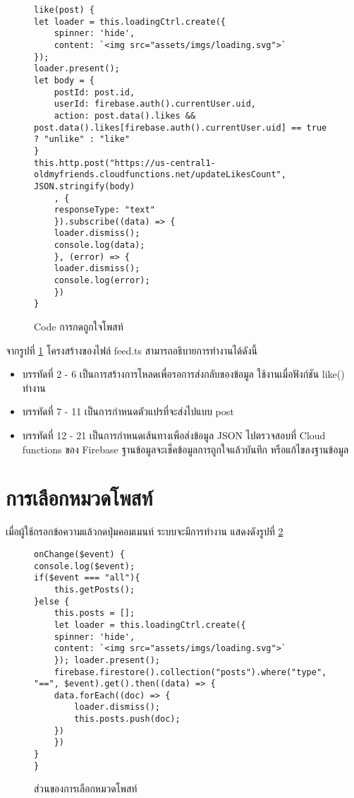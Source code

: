 \begin{figure}[H]
{\lstset{language=Pascal}
\begin{lstlisting}
like(post) {
let loader = this.loadingCtrl.create({
	spinner: 'hide',
	content: `<img src="assets/imgs/loading.svg">`
});
loader.present();
let body = {
	postId: post.id,
	userId: firebase.auth().currentUser.uid,
	action: post.data().likes && post.data().likes[firebase.auth().currentUser.uid] == true ? "unlike" : "like"
}
this.http.post("https://us-central1-oldmyfriends.cloudfunctions.net/updateLikesCount", JSON.stringify(body)
	, {
	responseType: "text"
	}).subscribe((data) => {
	loader.dismiss();
	console.log(data);
	}, (error) => {
	loader.dismiss();
	console.log(error);
	})
}
\end{lstlisting}}
\caption{Code การกดถูกใจโพสท์}
\label{Fig:4-likepost}
\end{figure}

จากรูปที่ \ref{Fig:4-likepost} โครงสร้างของไฟล์ feed.ts สามารถอธิบายการทำงานได้ดังนี้
\begin{itemize}[label={--}]
\item บรรทัดที่ 2 - 6 เป็นการสร้างการโหลดเพื่อรอการส่งกลับของข้อมูล ใช้งานเมื่อฟังก์ชัน like() ทำงาน
\item บรรทัดที่ 7 - 11 เป็นการกำหนดตัวแปรที่จะส่งไปแบบ post
\item บรรทัดที่ 12 - 21 เป็นการกำหนดเส้นทางเพือส่งข้อมูล JSON ไปตรวจสอบที่ Cloud functions ของ Firebase ฐานข้อมูลจะเช็คข้อมูลการถูกใจแล้วบันทึก หรือแก้ไขลงฐานข้อมูล
\end{itemize}
\newpage



\section{การเลือกหมวดโพสท์}
เมื่อผู้ใช้กรอกข้อความแล้วกดปุ่มคอมเมนท์ ระบบจะมีการทำงาน แสดงดังรูปที่ \ref{Fig:4-selectpost}

\begin{figure}[H]
{\lstset{language=Pascal}
\begin{lstlisting}
onChange($event) {
console.log($event);
if($event === "all"){
	this.getPosts();
}else {
	this.posts = [];
	let loader = this.loadingCtrl.create({
	spinner: 'hide',
	content: `<img src="assets/imgs/loading.svg">`
	}); loader.present();
	firebase.firestore().collection("posts").where("type", "==", $event).get().then((data) => {
	data.forEach((doc) => {
		loader.dismiss();
		this.posts.push(doc);
	})
	})
}
}
\end{lstlisting}}
\caption{ส่วนของการเลือกหมวดโพสท์}
\label{Fig:4-selectpost}
\end{figure}

